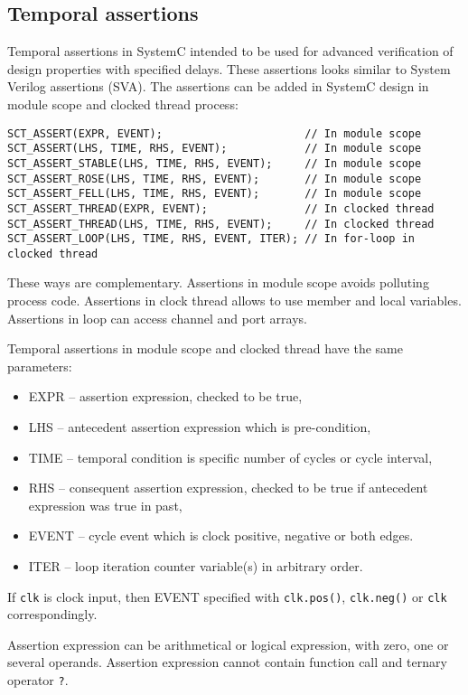 \subsection{Temporal assertions}

Temporal assertions in SystemC intended to be used for advanced verification of design properties with specified delays. These assertions looks similar to System Verilog assertions (SVA). The assertions can be added in SystemC design in module scope and clocked thread process:

\begin{lstlisting}[style=mycpp]
SCT_ASSERT(EXPR, EVENT);                      // In module scope 
SCT_ASSERT(LHS, TIME, RHS, EVENT);            // In module scope 
SCT_ASSERT_STABLE(LHS, TIME, RHS, EVENT);     // In module scope 
SCT_ASSERT_ROSE(LHS, TIME, RHS, EVENT);       // In module scope 
SCT_ASSERT_FELL(LHS, TIME, RHS, EVENT);       // In module scope 
SCT_ASSERT_THREAD(EXPR, EVENT);               // In clocked thread 
SCT_ASSERT_THREAD(LHS, TIME, RHS, EVENT);     // In clocked thread 
SCT_ASSERT_LOOP(LHS, TIME, RHS, EVENT, ITER); // In for-loop in clocked thread
\end{lstlisting}
%
These ways are complementary. Assertions in module scope avoids polluting process code. Assertions in clock thread allows to use member and local variables. Assertions in loop can access channel and port arrays.

Temporal assertions in module scope and clocked thread have the same parameters:
\begin{itemize}
\item EXPR -- assertion expression, checked to be true,
\item LHS -- antecedent assertion expression which is pre-condition, 
\item TIME -- temporal condition is specific number of cycles or cycle interval,
\item RHS -- consequent assertion expression, checked to be true if antecedent expression was true in past,
\item EVENT -- cycle event which is clock positive, negative or both edges.
\item ITER -- loop iteration counter variable(s) in arbitrary order.
\end{itemize}

If {\tt clk} is clock input, then EVENT specified with {\tt clk.pos()}, {\tt clk.neg()} or {\tt clk} correspondingly. 

Assertion expression can be arithmetical or logical expression, with zero, one or several operands. Assertion expression cannot contain function call and ternary operator {\tt ?}.

